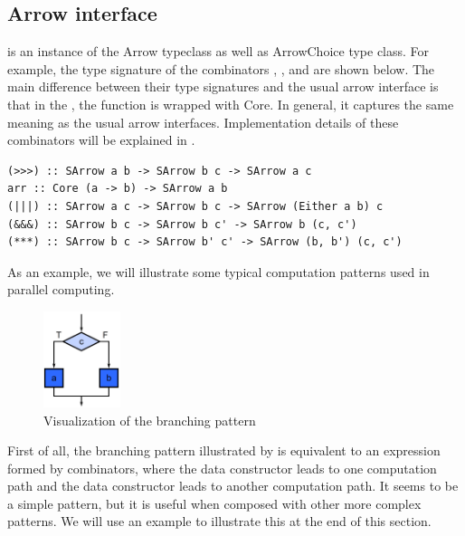 \subsection{Arrow interface}
 is an instance of the Arrow typeclass as well as ArrowChoice type class. For example, the type signature of the combinators \hask{>>>}, \hask{|||}, \hask{&&&} and  are shown below. The main difference between their type signatures and the usual arrow interface is that in the , the function is wrapped with Core. In general, it captures the same meaning as the usual arrow interfaces. Implementation details of these combinators will be explained in .
\begin{code}
\begin{verbatim}
(>>>) :: SArrow a b -> SArrow b c -> SArrow a c
arr :: Core (a -> b) -> SArrow a b
(|||) :: SArrow a c -> SArrow b c -> SArrow (Either a b) c
(&&&) :: SArrow b c -> SArrow b c' -> SArrow b (c, c')
(***) :: SArrow b c -> SArrow b' c' -> SArrow (b, b') (c, c')
\end{verbatim}
\end{code}

As an example, we will illustrate some typical computation patterns used in parallel computing.
\begin{figure}[ht]
    \centering
    \includegraphics[width=0.2\textwidth]{arrow/select.png}
    \caption{Visualization of the branching pattern \cite{mccoolStructuredParallelPrograming2012}}
    \label{SArrow:fig:select}
\end{figure}

First of all, the branching pattern illustrated by  is equivalent to an expression formed by \hask{|||} combinators, where the data constructor  leads to one computation path and the data constructor  leads to another computation path. It seems to be a simple pattern, but it is useful when composed with other more complex patterns. We will use an example to illustrate this at the end of this section.

